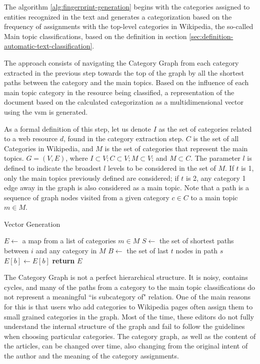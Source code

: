The algorithm \ref{alg:fingerprint-generation} begins with the categories assigned to entities recognized in the text and generates a categorization based on the frequency of assignments with the top-level categories in Wikipedia, the so-called Main topic classifications, based on the definition in section \ref{sec:definition-automatic-text-classification}.

The approach consists of navigating the Category Graph from each category extracted in the previous step towards the top of the graph by all the shortest paths between the category and the main topics. Based on the influence of each main topic category in the resource being classified, a representation of the document based on the calculated categorization as a multidimensional vector using the \gls{vsm} is generated.

As a formal definition of this step, let us denote $I$ as the set of categories related to a web resource $d$, found in the category extraction step. $C$ is the set of all Categories in Wikipedia, and $M$ is the set of categories that represent the main topics. $G = (V,E)$, where $I \subset V ; C \subset V ; M \subset V$; and $M \subset C$.  The parameter  $l$ is defined to indicate the broadest $l$ levels to be considered in the set of $M$. If $t$ is 1, only the main topics previously defined are considered; if $t$ is 2, any category 1 edge away in the graph is also considered as a main topic. 
Note that a path is a sequence of graph nodes visited from a given category $c \in C$ to a main topic $m \in M$.  

\begin{algorithm}
\caption{Vector Generation}\label{alg:fingerprint}
\label{alg:fingerprint-generation}
\begin{algorithmic}[1]
\State $E\gets$ a map from a list of categories $ m \in M$
\State $S\gets$ the set of shortest paths between $i$ and any category in $M$
\State $B\gets$ the set of last $t$ nodes in path $s$
\State $E[b]\gets E[b]$
\EndFor
\EndFor
\EndFor
\State \textbf{return} $E$
\EndProcedure
\end{algorithmic}
\end{algorithm}


The Category Graph is not a perfect hierarchical structure. It is noisy, contains cycles, and many of the paths from a category to the main topic classifications do not represent a meaningful ``is subcategory of" relation. One of the main reasons for this is that users who add categories to Wikipedia pages often assign them to small grained categories in the graph. Most of the time, these editors do not fully understand the internal structure of the graph and fail to follow the guidelines when choosing particular categories. The category graph, as well as the content of the articles, can be changed over time, also changing from the original intent of the author and the meaning of the category assignments.

